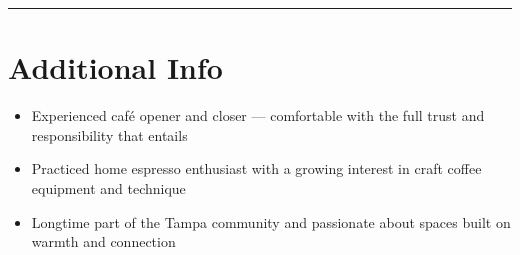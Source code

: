 \documentclass[11pt]{article}
\begin{document}
\hrule
\vspace{0.5em}

\section*{Additional Info}
\begin{itemize}[leftmargin=*, itemsep=1pt, topsep=3pt]
    \item Experienced caf\'{e} opener and closer --- comfortable with the full trust and responsibility that entails
    \item Practiced home espresso enthusiast with a growing interest in craft coffee equipment and technique
    \item Longtime part of the Tampa community and passionate about spaces built on warmth and connection
\end{itemize}
\end{document}
